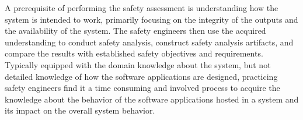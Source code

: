 A prerequisite of performing the safety assessment is understanding how the system is intended to work, primarily focusing on the integrity of the outputs and the availability of the system. The safety engineers then use the acquired understanding to conduct safety analysis, construct safety analysis artifacts, and compare the results with established safety objectives and requirements.
Typically equipped with the domain knowledge about the system, but not detailed knowledge of how the software applications are designed, practicing safety engineers find it a time consuming and involved process to acquire the knowledge about the behavior of the software applications hosted in a system and its impact on the overall system behavior.



